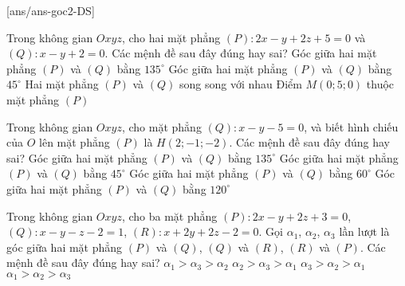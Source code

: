 \TNTF
{}[ans/ans-goc2-DS]
\begin{ex}%
	Trong không gian $Oxyz$, cho hai mặt phẳng $(P)\colon 2x-y+2z+5=0$ và $(Q)\colon x-y+2=0$. Các mệnh đề sau đây đúng hay sai?
	\choiceTF
	{Góc giữa hai mặt phẳng $(P)$ và $(Q)$ bằng $135^\circ$}
	{\True Góc giữa hai mặt phẳng $(P)$ và $(Q)$ bằng $45^\circ$}
	{Hai mặt phẳng $(P)$ và $(Q)$ song song với nhau}
	{\True Điểm $M\left(0;5;0\right)$ thuộc mặt phẳng $(P)$}
\end{ex}
\begin{ex}%
	Trong không gian $Oxyz$, cho mặt phẳng $(Q)\colon x-y-5=0$, và biết hình chiếu của $O$ lên mặt phẳng $(P)$ là $H\left(2;-1;-2\right)$. Các mệnh đề sau đây đúng hay sai?
	\choiceTF
	{Góc giữa hai mặt phẳng $(P)$ và $(Q)$ bằng $135^\circ$}
	{\True Góc giữa hai mặt phẳng $(P)$ và $(Q)$ bằng $45^\circ $}
	{Góc giữa hai mặt phẳng $(P)$ và $(Q)$ bằng $60^\circ $}
	{Góc giữa hai mặt phẳng $(P)$ và $(Q)$ bằng $120^\circ$}
\end{ex}
\begin{ex}%
	Trong không gian $Oxyz$, cho ba mặt phẳng $(P)\colon 2x-y+2z+3=0$, $(Q)\colon x-y-z-2=1$, $(R)\colon x+2y+2z-2=0$. Gọi $\alpha_1$, $\alpha_2$, $\alpha_3$ lần lượt là góc giữa hai mặt phẳng $(P)$ và $(Q)$, $(Q)$ và $(R)$, $(R)$ và $(P)$. Các mệnh đề sau đây đúng hay sai?
	\choiceTF
	{\True $\alpha_1>\alpha_3>\alpha_2$}
	{$\alpha_2>\alpha_3>\alpha_1$}
	{$\alpha_3>\alpha_2>\alpha_1$}
	{$\alpha_1>\alpha_2>\alpha_3$}
\end{ex}

